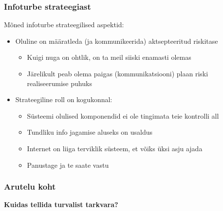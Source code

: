 \begin{frame}[fragile]
  \frametitle{Infoturbe strateegiast}
	Mõned infoturbe strateegilised aspektid:
	\begin{itemize}
		\item Oluline on määratleda (ja kommunikeerida) aktsepteeritud riskitase
		\begin{itemize}
			\item Kuigi nuga on ohtlik, on ta meil siiski enamasti olemas
			\item Järelikult peab olema paigas (kommunikatsiooni) plaan riski realiseerumise puhuks
		\end{itemize}
		\item Strateegiline roll on kogukonnal:
		\begin{itemize}
			\item Süsteemi olulised komponendid ei ole tingimata teie kontrolli all
			\item Tundliku info jagamise aluseks on usaldus
			\item Internet on liiga terviklik süsteem, et võiks üksi asju ajada
			\item Panustage ja te saate vastu
		\end{itemize}

	\end{itemize}
\end{frame}


\begin{frame}[fragile]
  \frametitle{Arutelu koht}
		\begin{center}
			\textbf{Kuidas tellida turvalist tarkvara?}
		\end{center}
\end{frame}

